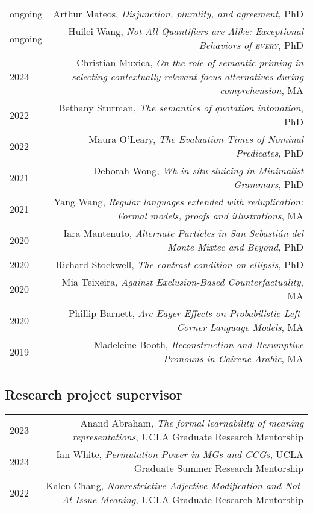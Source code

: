 \documentclass[12pt]{article}
\begin{document}
\begin{longtable}{LR}
  ongoing & Arthur Mateos, \textit{Disjunction, plurality, and agreement}, PhD\\
  ongoing & Huilei Wang, \textit{Not All Quantifiers are Alike: Exceptional
            Behaviors of \textsc{every}}, PhD\\
  2023    & Christian Muxica, \textit{On the role of semantic priming in
            selecting contextually relevant focus-alternatives during
            comprehension}, MA\\
  2022    & Bethany Sturman, \textit{The semantics of quotation intonation},
            PhD\\
  2022    & Maura O'Leary, \textit{The Evaluation Times of Nominal Predicates},
            PhD\\
  2021    & Deborah Wong, \textit{Wh-in situ sluicing in Minimalist Grammars},
            PhD\\
  2021    & Yang Wang, \textit{Regular languages extended with reduplication:
            Formal models, proofs and illustrations}, MA\\
  2020    & Iara Mantenuto, \textit{Alternate Particles in San Sebasti\'{a}n del
            Monte Mixtec and Beyond}, PhD\\
  2020    & Richard Stockwell, \textit{The contrast condition on ellipsis},
            PhD\\
  2020    & Mia Teixeira, \textit{Against Exclusion-Based Counterfactuality},
            MA\\
  2020    & Phillip Barnett, \textit{Arc-Eager Effects on Probabilistic
            Left-Corner Language Models}, MA\\
  2019    & Madeleine Booth, \textit{Reconstruction and Resumptive Pronouns in
            Cairene Arabic}, MA
\end{longtable}

\subsection*{Research project supervisor}

\begin{longtable}{LR}
  2023     & Anand Abraham, \textit{The formal learnability of meaning
             representations}, UCLA Graduate Research Mentorship
  \\
  2023     & Ian White, \textit{Permutation Power in MGs and CCGs}, UCLA
             Graduate Summer Research Mentorship
  \\
  2022     & Kalen Chang, \textit{Nonrestrictive Adjective Modification and
             Not-At-Issue Meaning}, UCLA Graduate Research Mentorship
\end{longtable}
\end{document}
